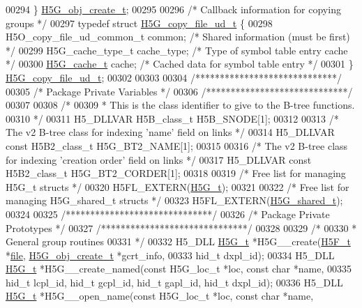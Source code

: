 \begin{DoxyCode}
00294 \} \hyperlink{struct_h5_g__obj__create__t}{H5G\_obj\_create\_t};
00295 
00296 \textcolor{comment}{/* Callback information for copying groups */}
00297 \textcolor{keyword}{typedef} \textcolor{keyword}{struct }\hyperlink{struct_h5_g__copy__file__ud__t}{H5G\_copy\_file\_ud\_t} \{
00298     H5O\_copy\_file\_ud\_common\_t common;   \textcolor{comment}{/* Shared information (must be first) */}
00299     H5G\_cache\_type\_t cache\_type;        \textcolor{comment}{/* Type of symbol table entry cache */}
00300     \hyperlink{union_h5_g__cache__t}{H5G\_cache\_t} cache;                  \textcolor{comment}{/* Cached data for symbol table entry */}
00301 \} \hyperlink{struct_h5_g__copy__file__ud__t}{H5G\_copy\_file\_ud\_t};
00302 
00303 
00304 \textcolor{comment}{/*****************************/}
00305 \textcolor{comment}{/* Package Private Variables */}
00306 \textcolor{comment}{/*****************************/}
00307 
00308 \textcolor{comment}{/*}
00309 \textcolor{comment}{ * This is the class identifier to give to the B-tree functions.}
00310 \textcolor{comment}{ */}
00311 H5\_DLLVAR H5B\_class\_t H5B\_SNODE[1];
00312 
00313 \textcolor{comment}{/* The v2 B-tree class for indexing 'name' field on links */}
00314 H5\_DLLVAR \textcolor{keyword}{const} H5B2\_class\_t H5G\_BT2\_NAME[1];
00315 
00316 \textcolor{comment}{/* The v2 B-tree class for indexing 'creation order' field on links */}
00317 H5\_DLLVAR \textcolor{keyword}{const} H5B2\_class\_t H5G\_BT2\_CORDER[1];
00318 
00319 \textcolor{comment}{/* Free list for managing H5G\_t structs */}
00320 H5FL\_EXTERN(\hyperlink{struct_h5_g__t}{H5G\_t});
00321 
00322 \textcolor{comment}{/* Free list for managing H5G\_shared\_t structs */}
00323 H5FL\_EXTERN(\hyperlink{struct_h5_g__shared__t}{H5G\_shared\_t});
00324 
00325 \textcolor{comment}{/******************************/}
00326 \textcolor{comment}{/* Package Private Prototypes */}
00327 \textcolor{comment}{/******************************/}
00328 
00329 \textcolor{comment}{/*}
00330 \textcolor{comment}{ * General group routines}
00331 \textcolor{comment}{ */}
00332 H5\_DLL \hyperlink{struct_h5_g__t}{H5G\_t} *H5G\_\_create(\hyperlink{struct_h5_f__t}{H5F\_t} *\hyperlink{structfile}{file}, \hyperlink{struct_h5_g__obj__create__t}{H5G\_obj\_create\_t} *gcrt\_info,
00333     hid\_t dxpl\_id);
00334 H5\_DLL \hyperlink{struct_h5_g__t}{H5G\_t} *H5G\_\_create\_named(\textcolor{keyword}{const} H5G\_loc\_t *loc, \textcolor{keyword}{const} \textcolor{keywordtype}{char} *name,
00335     hid\_t lcpl\_id, hid\_t gcpl\_id, hid\_t gapl\_id, hid\_t dxpl\_id);
00336 H5\_DLL \hyperlink{struct_h5_g__t}{H5G\_t} *H5G\_\_open\_name(\textcolor{keyword}{const} H5G\_loc\_t *loc, \textcolor{keyword}{const} \textcolor{keywordtype}{char} *name,

\end{DoxyCode}
